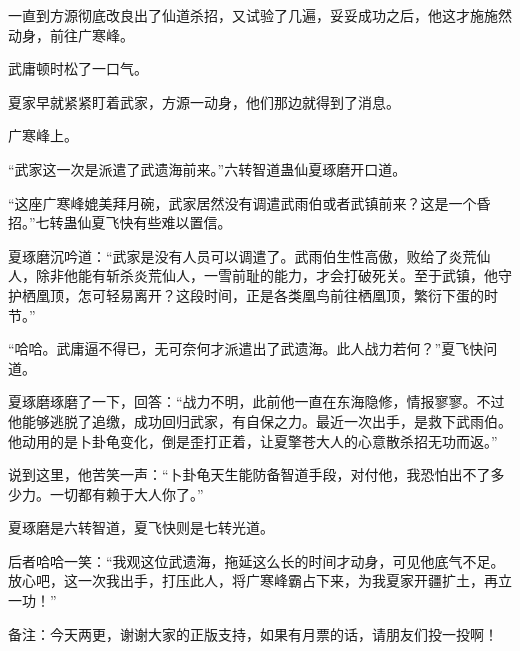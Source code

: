 \begin{this_body}
一直到方源彻底改良出了仙道杀招，又试验了几遍，妥妥成功之后，他这才施施然动身，前往广寒峰。

武庸顿时松了一口气。

夏家早就紧紧盯着武家，方源一动身，他们那边就得到了消息。

广寒峰上。

“武家这一次是派遣了武遗海前来。”六转智道蛊仙夏琢磨开口道。

“这座广寒峰媲美拜月碗，武家居然没有调遣武雨伯或者武镇前来？这是一个昏招。”七转蛊仙夏飞快有些难以置信。

夏琢磨沉吟道：“武家是没有人员可以调遣了。武雨伯生性高傲，败给了炎荒仙人，除非他能有斩杀炎荒仙人，一雪前耻的能力，才会打破死关。至于武镇，他守护栖凰顶，怎可轻易离开？这段时间，正是各类凰鸟前往栖凰顶，繁衍下蛋的时节。”

“哈哈。武庸逼不得已，无可奈何才派遣出了武遗海。此人战力若何？”夏飞快问道。

夏琢磨琢磨了一下，回答：“战力不明，此前他一直在东海隐修，情报寥寥。不过他能够逃脱了追缴，成功回归武家，有自保之力。最近一次出手，是救下武雨伯。他动用的是卜卦龟变化，倒是歪打正着，让夏擎苍大人的心意散杀招无功而返。”

说到这里，他苦笑一声：“卜卦龟天生能防备智道手段，对付他，我恐怕出不了多少力。一切都有赖于大人你了。”

夏琢磨是六转智道，夏飞快则是七转光道。

后者哈哈一笑：“我观这位武遗海，拖延这么长的时间才动身，可见他底气不足。放心吧，这一次我出手，打压此人，将广寒峰霸占下来，为我夏家开疆扩土，再立一功！”

备注：今天两更，谢谢大家的正版支持，如果有月票的话，请朋友们投一投啊！

\end{this_body}

